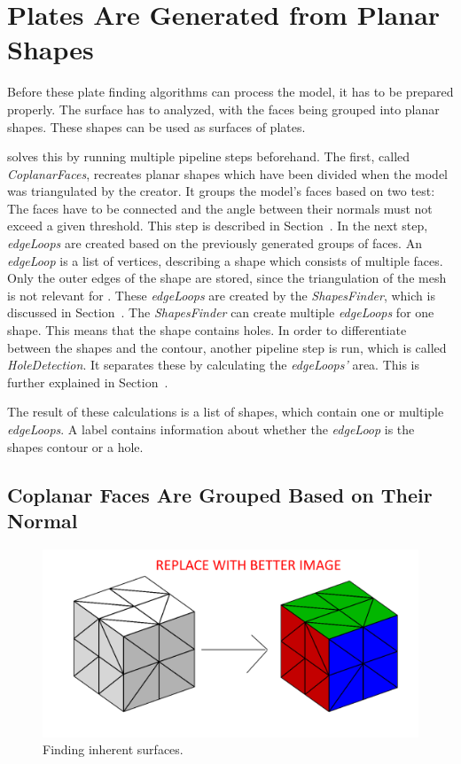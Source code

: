 \documentclass[../ClassicThesis.tex]{subfiles}
\begin{document}
\section{Plates Are Generated from Planar Shapes}

Before these plate finding algorithms can process the model, it has to be prepared properly. The surface has to analyzed, with the faces being grouped into planar shapes. These shapes can be used as surfaces of plates. 

{\platener} solves this by running multiple pipeline steps beforehand. The first, called \emph{CoplanarFaces}, recreates planar shapes which have been divided when the model was triangulated by the creator. It groups the model's faces based on two test: The faces have to be connected and the angle between their normals must not exceed a given threshold. This step is described in Section~. In the next step, \emph{edgeLoops} are created based on the previously generated groups of faces. An \emph{edgeLoop} is a list of vertices, describing a shape which consists of multiple faces. Only the outer edges of the shape are stored, since the triangulation of the mesh is not relevant for \platener{}. These \emph{edgeLoops} are created by the \emph{ShapesFinder}, which is discussed in Section~. The \emph{ShapesFinder} can create multiple \emph{edgeLoops} for one shape. This means that the shape contains holes. In order to differentiate between the shapes and the contour, another pipeline step is run, which is called \emph{HoleDetection}. It separates these by calculating the \emph{edgeLoops'} area. This is further explained in Section~.

The result of these calculations is a list of shapes, which contain one or multiple \emph{edgeLoops}. A label contains information about whether the \emph{edgeLoop} is the shapes contour or a hole.

\subsection{Coplanar Faces Are Grouped Based on Their Normal}\label{sub:coplanarfaces}

\begin{figure}
    \centering
    \includegraphics[width=1.0\columnwidth]{Images/plates_coplanar.png}
    \caption{Finding inherent surfaces.}
    \label{fig:coplanar}
\end{figure}
\end{document}
